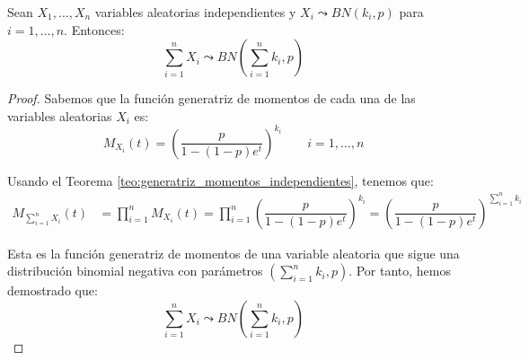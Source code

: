 \begin{prop}
    Sean $X_1, \dots, X_n$ variables aleatorias independientes y $X_i\leadsto BN(k_i, p)$ para $i=1,\dots,n$. Entonces:
    \begin{equation*}
        \sum_{i=1}^{n}X_i \leadsto BN\left(\sum_{i=1}^{n}k_i, p\right)
    \end{equation*}

    \begin{proof}
        Sabemos que la función generatriz de momentos de cada una de las variables aleatorias $X_i$ es:
        \begin{equation*}
            M_{X_i}(t) = \left(\dfrac{p}{1-(1-p)e^t}\right)^{k_i} \qquad i=1,\dots,n
        \end{equation*}

        Usando el Teorema \ref{teo:generatriz_momentos_independientes}, tenemos que:
        \begin{align*}
            M_{\sum\limits_{i=1}^{n}X_i}(t) &= \prod_{i=1}^{n}M_{X_i}(t) = \prod_{i=1}^{n}\left(\dfrac{p}{1-(1-p)e^t}\right)^{k_i} = \left(\dfrac{p}{1-(1-p)e^t}\right)^{\sum\limits_{i=1}^{n}k_i}
        \end{align*}

        Esta es la función generatriz de momentos de una variable aleatoria que sigue una distribución binomial negativa con parámetros $\left(\sum\limits_{i=1}^{n}k_i, p\right)$. Por tanto, hemos demostrado que:
        \begin{equation*}
            \sum_{i=1}^{n}X_i \leadsto BN\left(\sum_{i=1}^{n}k_i, p\right)
        \end{equation*}
    \end{proof}
\end{prop}